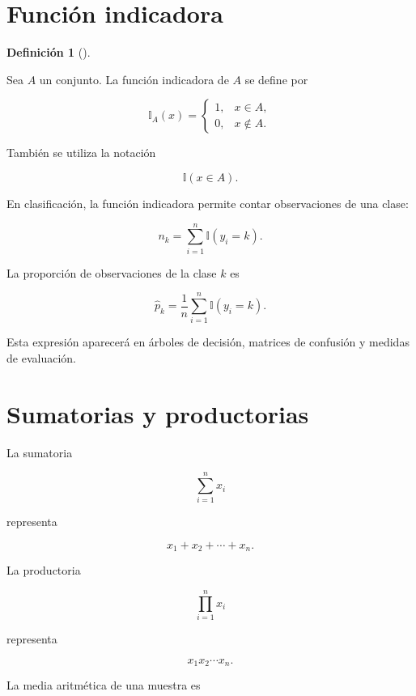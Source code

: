 \documentclass[
  spanish,
  10.5pt,
  letterpaper,
  DIV=11,
  numbers=noendperiod,
  oneside,
  open=any]{scrreprt}
\theoremstyle{definition}
\newtheorem{definition}{Definición}[chapter]
\theoremstyle{definition}
\theoremstyle{plain}
\theoremstyle{remark}
\begin{document}
\section*{Función indicadora}\label{funciuxf3n-indicadora}


\begin{definition}[]\protect\hypertarget{def-indicadora}{}\label{def-indicadora}

Sea \(A\) un conjunto. La función indicadora de \(A\) se define por

\[
\mathbb{I}_{A}(x)
=
\begin{cases}
1, & x\in A,\\
0, & x\notin A.
\end{cases}
\]

\end{definition}

También se utiliza la notación

\[
\mathbb{I}(x\in A).
\]

En clasificación, la función indicadora permite contar observaciones de
una clase:

\[
n_k
=
\sum_{i=1}^{n}
\mathbb{I}(y_i=k).
\]

La proporción de observaciones de la clase \(k\) es

\[
\widehat{p}_k
=
\frac{1}{n}
\sum_{i=1}^{n}
\mathbb{I}(y_i=k).
\]

Esta expresión aparecerá en árboles de decisión, matrices de confusión y
medidas de evaluación.

\section*{Sumatorias y productorias}\label{sumatorias-y-productorias}


La sumatoria

\[
\sum_{i=1}^{n}x_i
\]

representa

\[
x_1+x_2+\cdots+x_n.
\]

La productoria

\[
\prod_{i=1}^{n}x_i
\]

representa

\[
x_1x_2\cdots x_n.
\]

La media aritmética de una muestra es
\end{document}
